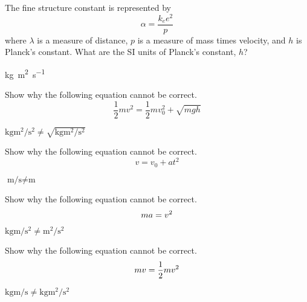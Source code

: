 \begin{question}[ID=DA11,topic=measurement,difficulty=easy]
    The fine structure constant is represented by
    \begin{equation*}
        \alpha = \frac{k_e e^2}{p}
    \end{equation*}
    where $\lambda$ is a measure of distance, $p$ is a measure of mass times velocity,
        and $h$ is Planck's constant.
    What are the SI units of Planck's constant, $h$?
\end{question}
\begin{solution}
    \si{\kilo\gram\meter\squared\per\second}
\end{solution}


\begin{question}[ID=DA21,topic=measurement,difficulty=easy]
    Show why the following equation cannot be correct.
    \begin{equation*}
        \frac{1}{2} m v^2 = \frac{1}{2} mv_0^2 + \sqrt{mgh}
    \end{equation*}
\end{question}
\begin{solution}
    $\si{\kilo\gram\meter\squared\per\second\squared} \neq
        \sqrt{\si{\kilo\gram\meter\squared\per\second\squared}}$
\end{solution}

\begin{question}[ID=DA22,topic=measurement,difficulty=easy]
    Show why the following equation cannot be correct.
    \begin{equation*}
        v = v_0 + at^2 
    \end{equation*}
\end{question}
\begin{solution}
    $\si{\meter\per\second} \neq \si{\meter}$
\end{solution}

\begin{question}[ID=DA23,topic=measurement,difficulty=easy]
    Show why the following equation cannot be correct.
    \begin{equation*}
        ma = v^2 \\
    \end{equation*}
\end{question}
\begin{solution}
    $\si{\kilo\gram\meter\per\second\squared} \neq \si{\meter\squared\per\second\squared}$
\end{solution}

\begin{question}[ID=DA24,topic=measurement,difficulty=easy]
    Show why the following equation cannot be correct.
    \begin{equation*}
        mv = \frac{1}{2}mv^2 \\
    \end{equation*}
\end{question}
\begin{solution}
    $\si{\kilo\gram\meter\per\second} \neq \si{\kilo\gram\meter\squared\per\second\squared}$
\end{solution}

\endinput

